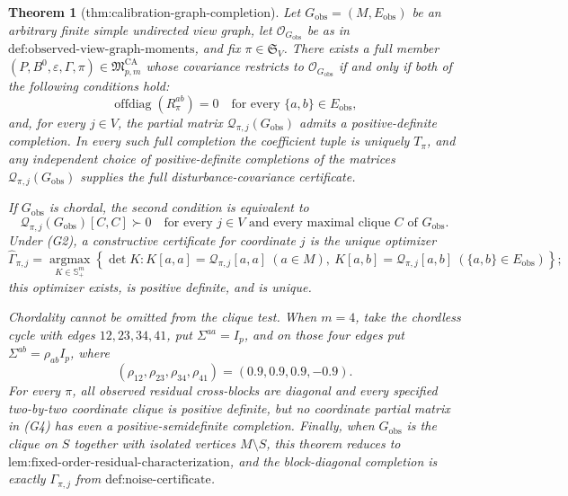 \documentclass{article}
\newtheorem{theorem}{Theorem}
\begin{document}
\begin{theorem}[thm:calibration-graph-completion]\label{thm:calibration-graph-completion}
Let \(G_{\mathrm{obs}}=(M,E_{\mathrm{obs}})\) be an arbitrary finite simple undirected view graph, let \(\mathcal O_{G_{\mathrm{obs}}}\) be as in \(\text{def:observed-view-graph-moments}\), and fix \(\pi\in\mathfrak S_V\).  There exists a full member \((P,B^0,\varepsilon,\Gamma,\pi)\in\mathfrak M_{p,m}^{\mathrm{CA}}\) whose covariance restricts to \(\mathcal O_{G_{\mathrm{obs}}}\) if and only if both of the following conditions hold:
\[
\operatorname{offdiag}(R_\pi^{ab})=0
\quad\text{for every }\{a,b\}\in E_{\mathrm{obs}},
\tag{G1}
\]
and, for every \(j\in V\), the partial matrix \(\mathcal Q_{\pi,j}(G_{\mathrm{obs}})\) admits a positive-definite completion.  In every such full completion the coefficient tuple is uniquely \(T_\pi\), and any independent choice of positive-definite completions of the matrices \(\mathcal Q_{\pi,j}(G_{\mathrm{obs}})\) supplies the full disturbance-covariance certificate.

If \(G_{\mathrm{obs}}\) is chordal, the second condition is equivalent to
\[
\mathcal Q_{\pi,j}(G_{\mathrm{obs}})[C,C]\succ0
\quad\text{for every }j\in V
\text{ and every maximal clique }C\text{ of }G_{\mathrm{obs}}.
\tag{G2}
\]
Under (G2), a constructive certificate for coordinate \(j\) is the unique optimizer
\[
\widehat\Gamma_{\pi,j}
=\operatorname*{argmax}_{K\in\mathbb S_+^m}
\left\{\det K:
K[a,a]=\mathcal Q_{\pi,j}[a,a]\ (a\in M),\ 
K[a,b]=\mathcal Q_{\pi,j}[a,b]\ (\{a,b\}\in E_{\mathrm{obs}})
\right\};
\tag{G3}
\]
this optimizer exists, is positive definite, and is unique.

Chordality cannot be omitted from the clique test.  When \(m=4\), take the chordless cycle with edges \(12,23,34,41\), put \(\Sigma^{aa}=I_p\), and on those four edges put \(\Sigma^{ab}=\rho_{ab}I_p\), where
\[
(\rho_{12},\rho_{23},\rho_{34},\rho_{41})=(0.9,0.9,0.9,-0.9).
\tag{G4}
\]
For every \(\pi\), all observed residual cross-blocks are diagonal and every specified two-by-two coordinate clique is positive definite, but no coordinate partial matrix in (G4) has even a positive-semidefinite completion.  Finally, when \(G_{\mathrm{obs}}\) is the clique on \(S\) together with isolated vertices \(M\setminus S\), this theorem reduces to \(\text{lem:fixed-order-residual-characterization}\), and the block-diagonal completion is exactly \(\Gamma_{\pi,j}\) from \(\text{def:noise-certificate}\).
\end{theorem}
\end{document}
